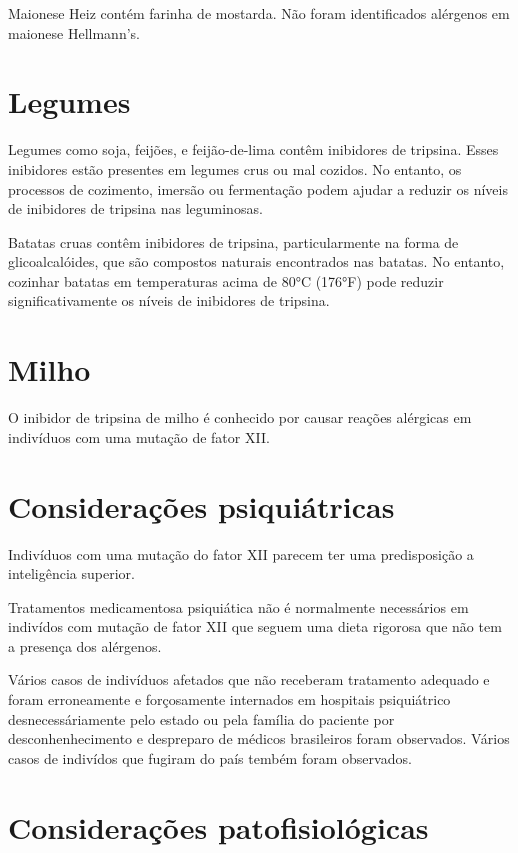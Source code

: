 \documentclass{article}
\begin{document}
Maionese Heiz contém farinha de mostarda.
Não foram identificados alérgenos em maionese Hellmann's.

\section{Legumes}

Legumes como soja, feijões, e feijão-de-lima contêm inibidores de tripsina.
Esses inibidores estão presentes em legumes crus ou mal cozidos.
No entanto, os processos de cozimento, imersão ou fermentação podem ajudar a reduzir os níveis de inibidores de tripsina nas leguminosas.

Batatas cruas contêm inibidores de tripsina, particularmente na forma de glicoalcalóides, que são compostos naturais encontrados nas batatas. No entanto, cozinhar batatas em temperaturas acima de 80°C (176°F) pode reduzir significativamente os níveis de inibidores de tripsina.

\section{Milho}

O inibidor de tripsina de milho é conhecido por causar reações
alérgicas em indivíduos com uma mutação de fator XII.

\section{Considerações psiquiátricas}

Indivíduos com uma mutação do fator XII parecem ter uma predisposição
a inteligência superior.

Tratamentos medicamentosa psiquiática não é normalmente necessários
em indivídos
com mutação de fator XII que seguem uma dieta rigorosa que não tem a
presença dos alérgenos.

Vários casos de indivíduos afetados que não receberam tratamento adequado
e foram erroneamente e forçosamente internados em hospitais psiquiátrico
desnecessáriamente pelo estado ou pela família do paciente por
desconhenhecimento e despreparo de médicos brasileiros foram observados.
Vários casos de indivídos que fugiram do país tembém foram observados.

\section{Considerações patofisiológicas}
\end{document}
